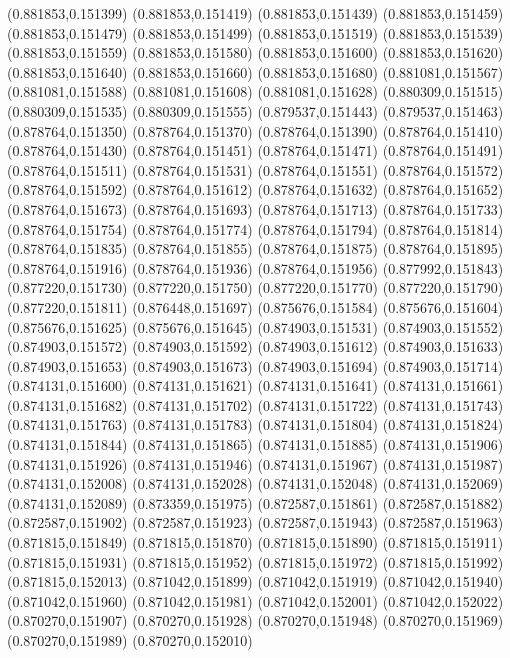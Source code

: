 (0.881853,0.151399)
(0.881853,0.151419)
(0.881853,0.151439)
(0.881853,0.151459)
(0.881853,0.151479)
(0.881853,0.151499)
(0.881853,0.151519)
(0.881853,0.151539)
(0.881853,0.151559)
(0.881853,0.151580)
(0.881853,0.151600)
(0.881853,0.151620)
(0.881853,0.151640)
(0.881853,0.151660)
(0.881853,0.151680)
(0.881081,0.151567)
(0.881081,0.151588)
(0.881081,0.151608)
(0.881081,0.151628)
(0.880309,0.151515)
(0.880309,0.151535)
(0.880309,0.151555)
(0.879537,0.151443)
(0.879537,0.151463)
(0.878764,0.151350)
(0.878764,0.151370)
(0.878764,0.151390)
(0.878764,0.151410)
(0.878764,0.151430)
(0.878764,0.151451)
(0.878764,0.151471)
(0.878764,0.151491)
(0.878764,0.151511)
(0.878764,0.151531)
(0.878764,0.151551)
(0.878764,0.151572)
(0.878764,0.151592)
(0.878764,0.151612)
(0.878764,0.151632)
(0.878764,0.151652)
(0.878764,0.151673)
(0.878764,0.151693)
(0.878764,0.151713)
(0.878764,0.151733)
(0.878764,0.151754)
(0.878764,0.151774)
(0.878764,0.151794)
(0.878764,0.151814)
(0.878764,0.151835)
(0.878764,0.151855)
(0.878764,0.151875)
(0.878764,0.151895)
(0.878764,0.151916)
(0.878764,0.151936)
(0.878764,0.151956)
(0.877992,0.151843)
(0.877220,0.151730)
(0.877220,0.151750)
(0.877220,0.151770)
(0.877220,0.151790)
(0.877220,0.151811)
(0.876448,0.151697)
(0.875676,0.151584)
(0.875676,0.151604)
(0.875676,0.151625)
(0.875676,0.151645)
(0.874903,0.151531)
(0.874903,0.151552)
(0.874903,0.151572)
(0.874903,0.151592)
(0.874903,0.151612)
(0.874903,0.151633)
(0.874903,0.151653)
(0.874903,0.151673)
(0.874903,0.151694)
(0.874903,0.151714)
(0.874131,0.151600)
(0.874131,0.151621)
(0.874131,0.151641)
(0.874131,0.151661)
(0.874131,0.151682)
(0.874131,0.151702)
(0.874131,0.151722)
(0.874131,0.151743)
(0.874131,0.151763)
(0.874131,0.151783)
(0.874131,0.151804)
(0.874131,0.151824)
(0.874131,0.151844)
(0.874131,0.151865)
(0.874131,0.151885)
(0.874131,0.151906)
(0.874131,0.151926)
(0.874131,0.151946)
(0.874131,0.151967)
(0.874131,0.151987)
(0.874131,0.152008)
(0.874131,0.152028)
(0.874131,0.152048)
(0.874131,0.152069)
(0.874131,0.152089)
(0.873359,0.151975)
(0.872587,0.151861)
(0.872587,0.151882)
(0.872587,0.151902)
(0.872587,0.151923)
(0.872587,0.151943)
(0.872587,0.151963)
(0.871815,0.151849)
(0.871815,0.151870)
(0.871815,0.151890)
(0.871815,0.151911)
(0.871815,0.151931)
(0.871815,0.151952)
(0.871815,0.151972)
(0.871815,0.151992)
(0.871815,0.152013)
(0.871042,0.151899)
(0.871042,0.151919)
(0.871042,0.151940)
(0.871042,0.151960)
(0.871042,0.151981)
(0.871042,0.152001)
(0.871042,0.152022)
(0.870270,0.151907)
(0.870270,0.151928)
(0.870270,0.151948)
(0.870270,0.151969)
(0.870270,0.151989)
(0.870270,0.152010)
